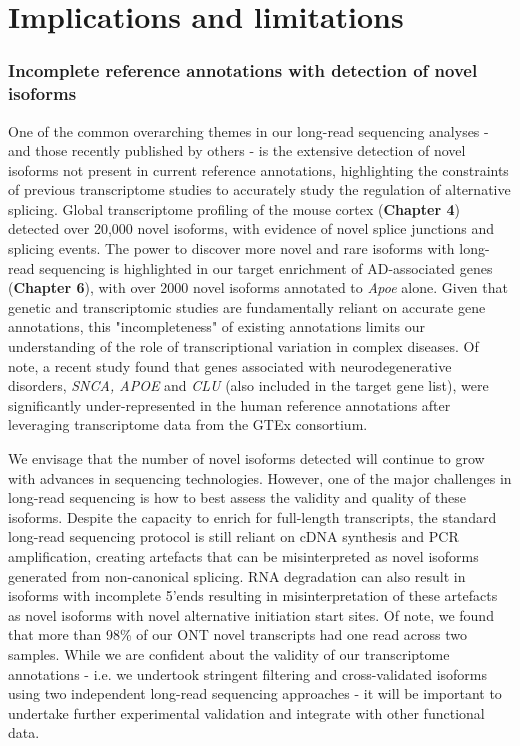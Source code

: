 \section{Implications and limitations}

\subsubsection{Incomplete reference annotations with detection of novel isoforms} 
One of the common overarching themes in our long-read sequencing analyses - and those recently published by others - is the extensive detection of novel isoforms not present in current reference annotations, highlighting the constraints of previous transcriptome studies to accurately study the regulation of alternative splicing. Global transcriptome profiling of the mouse cortex (\textbf{Chapter 4}) detected over 20,000 novel isoforms, with evidence of novel splice junctions and splicing events. The power to discover more novel and rare isoforms with long-read sequencing is highlighted in our target enrichment of AD-associated genes (\textbf{Chapter 6}), with over 2000 novel isoforms annotated to \textit{Apoe} alone. Given that genetic and transcriptomic studies are fundamentally reliant on accurate gene annotations, this "incompleteness" of existing annotations limits our understanding of the role of transcriptional variation in complex diseases. Of note, a recent study found that genes associated with neurodegenerative disorders, \textit{SNCA, APOE} and \textit{CLU} (also included in the target gene list), were significantly under-represented in the human reference annotations after leveraging transcriptome data from the GTEx consortium\cite{Zhang2020b}.  

We envisage that the number of novel isoforms detected will continue to grow with advances in sequencing technologies. However, one of the major challenges in long-read sequencing is how to best assess the validity and quality of these isoforms. Despite the capacity to enrich for full-length transcripts, the standard long-read sequencing protocol is still reliant on cDNA synthesis and PCR amplification, creating artefacts that can be misinterpreted as novel isoforms generated from non-canonical splicing. RNA degradation can also result in isoforms with incomplete 5'ends resulting in misinterpretation of these artefacts as novel isoforms with novel alternative initiation start sites\cite{Kuo2020}. Of note, we found that more than 98\% of our ONT novel transcripts had one read across two samples. While we are confident about the validity of our transcriptome annotations - i.e. we undertook stringent filtering and cross-validated isoforms using two independent long-read sequencing approaches - it will be important to undertake further experimental validation and integrate with other functional data. 

